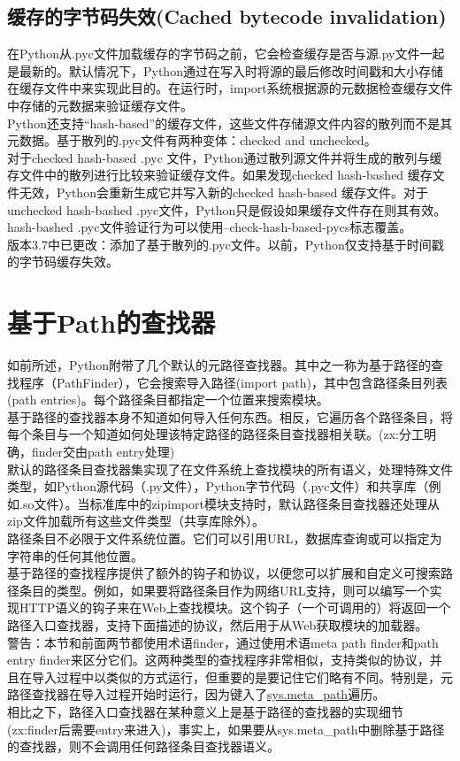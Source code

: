 \documentclass[10pt,UTF8]{ctexart}
\begin{document}
\subsection{缓存的字节码失效(Cached bytecode invalidation)}
在Python从.pyc文件加载缓存的字节码之前，它会检查缓存是否与源.py文件一起是最新的。默认情况下，Python通过在写入时将源的最后修改时间戳和大小存储在缓存文件中来实现此目的。在运行时，import系统根据源的元数据检查缓存文件中存储的元数据来验证缓存文件。\\
\indent Python还支持“hash-based”的缓存文件，这些文件存储源文件内容的散列而不是其元数据。基于散列的.pyc文件有两种变体：checked and unchecked。\\
\indent 对于checked hash-based .pyc 文件，Python通过散列源文件并将生成的散列与缓存文件中的散列进行比较来验证缓存文件。如果发现checked hash-bashed 缓存文件无效，Python会重新生成它并写入新的checked hash-based 缓存文件。对于unchecked hash-bashed .pyc文件，Python只是假设如果缓存文件存在则其有效。hash-bashed .pyc文件验证行为可以使用--check-hash-based-pycs标志覆盖。\\
\indent 版本3.7中已更改：添加了基于散列的.pyc文件。以前，Python仅支持基于时间戳的字节码缓存失效。

\section{基于Path的查找器}
如前所述，Python附带了几个默认的元路径查找器。其中之一称为基于路径的查找程序（PathFinder），它会搜索导入路径(import path)，其中包含路径条目列表(path entries)。每个路径条目都指定一个位置来搜索模块。\\
\indent 基于路径的查找器本身不知道如何导入任何东西。相反，它遍历各个路径条目，将每个条目与一个知道如何处理该特定路径的路径条目查找器相关联。(zx:分工明确，finder交由path entry处理)\\
\indent 默认的路径条目查找器集实现了在文件系统上查找模块的所有语义，处理特殊文件类型，如Python源代码（.py文件），Python字节代码（.pyc文件）和共享库（例如.so文件）。当标准库中的zipimport模块支持时，默认路径条目查找器还处理从zip文件加载所有这些文件类型（共享库除外）。\\
\indent 路径条目不必限于文件系统位置。它们可以引用URL，数据库查询或可以指定为字符串的任何其他位置。\\
\indent 基于路径的查找程序提供了额外的钩子和协议，以便您可以扩展和自定义可搜索路径条目的类型。例如，如果要将路径条目作为网络URL支持，则可以编写一个实现HTTP语义的钩子来在Web上查找模块。这个钩子（一个可调用的）将返回一个路径入口查找器，支持下面描述的协议，然后用于从Web获取模块的加载器。\\
\indent 警告：本节和前面两节都使用术语finder，通过使用术语meta path finder和path entry finder来区分它们。这两种类型的查找程序非常相似，支持类似的协议，并且在导入过程中以类似的方式运行，但重要的是要记住它们略有不同。特别是，元路径查找器在导入过程开始时运行，因为键入了\href{https://docs.python.org/3/library/sys.html#sys.meta_path}{sys.meta_path}遍历。\\
\indent 相比之下，路径入口查找器在某种意义上是基于路径的查找器的实现细节(zx:finder后需要entry来进入)，事实上，如果要从sys.meta_path中删除基于路径的查找器，则不会调用任何路径条目查找器语义。
\end{document}
